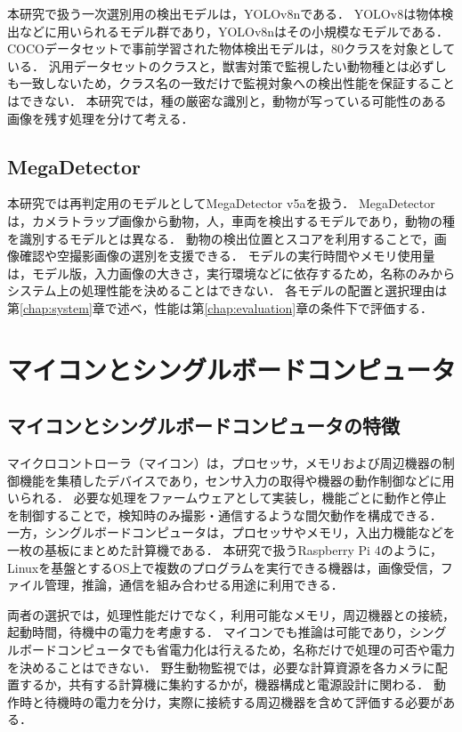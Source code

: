 本研究で扱う一次選別用の検出モデルは，YOLOv8nである．
YOLOv8は物体検出などに用いられるモデル群であり，YOLOv8nはその小規模なモデルである．
COCOデータセットで事前学習された物体検出モデルは，80クラスを対象としている\cite{UltralyticsYOLOv8}．
汎用データセットのクラスと，獣害対策で監視したい動物種とは必ずしも一致しないため，クラス名の一致だけで監視対象への検出性能を保証することはできない．
本研究では，種の厳密な識別と，動物が写っている可能性のある画像を残す処理を分けて考える．

\subsection{MegaDetector}
本研究では再判定用のモデルとしてMegaDetector v5aを扱う．
MegaDetectorは，カメラトラップ画像から動物，人，車両を検出するモデルであり，動物の種を識別するモデルとは異なる\cite{MegaDetectorDocs}．
動物の検出位置とスコアを利用することで，画像確認や空撮影画像の選別を支援できる\cite{Beery2019}．
モデルの実行時間やメモリ使用量は，モデル版，入力画像の大きさ，実行環境などに依存するため，名称のみからシステム上の処理性能を決めることはできない．
各モデルの配置と選択理由は第\ref{chap:system}章で述べ，性能は第\ref{chap:evaluation}章の条件下で評価する．

\section{マイコンとシングルボードコンピュータ}
\label{sec:background-computers}
\subsection{マイコンとシングルボードコンピュータの特徴}
マイクロコントローラ（マイコン）は，プロセッサ，メモリおよび周辺機器の制御機能を集積したデバイスであり，センサ入力の取得や機器の動作制御などに用いられる．
必要な処理をファームウェアとして実装し，機能ごとに動作と停止を制御することで，検知時のみ撮影・通信するような間欠動作を構成できる．
一方，シングルボードコンピュータは，プロセッサやメモリ，入出力機能などを一枚の基板にまとめた計算機である．
本研究で扱うRaspberry Pi 4のように，Linuxを基盤とするOS上で複数のプログラムを実行できる機器は，画像受信，ファイル管理，推論，通信を組み合わせる用途に利用できる\cite{RaspberryPiOS}．

両者の選択では，処理性能だけでなく，利用可能なメモリ，周辺機器との接続，起動時間，待機中の電力を考慮する．
マイコンでも推論は可能であり，シングルボードコンピュータでも省電力化は行えるため，名称だけで処理の可否や電力を決めることはできない．
野生動物監視では，必要な計算資源を各カメラに配置するか，共有する計算機に集約するかが，機器構成と電源設計に関わる．
動作時と待機時の電力を分け，実際に接続する周辺機器を含めて評価する必要がある\cite{Sato2022}．

